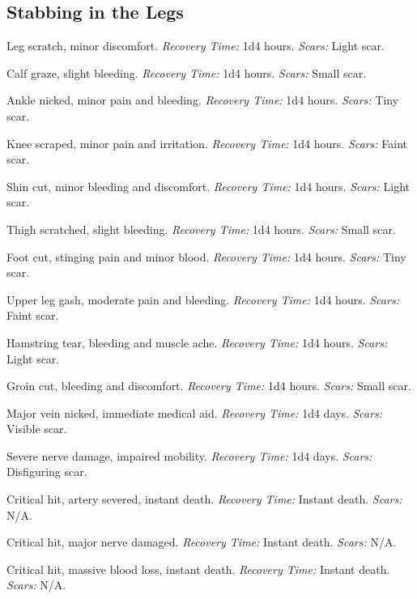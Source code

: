 \documentclass[12pt]{book}  %
\begin{document}
\subsection{Stabbing in the Legs}

\begin{description}[labelwidth=1.5em, leftmargin=*, itemsep=0.4em]
    \item[1 -] Leg scratch, minor discomfort. \textit{Recovery Time:} 1d4 hours. \textit{Scars:} Light scar.
    \item[2 -] Calf graze, slight bleeding. \textit{Recovery Time:} 1d4 hours. \textit{Scars:} Small scar.
    \item[3 -] Ankle nicked, minor pain and bleeding. \textit{Recovery Time:} 1d4 hours. \textit{Scars:} Tiny scar.
    \item[4 -] Knee scraped, minor pain and irritation. \textit{Recovery Time:} 1d4 hours. \textit{Scars:} Faint scar.
    \item[5 -] Shin cut, minor bleeding and discomfort. \textit{Recovery Time:} 1d4 hours. \textit{Scars:} Light scar.
    \item[6 -] Thigh scratched, slight bleeding. \textit{Recovery Time:} 1d4 hours. \textit{Scars:} Small scar.
    \item[7 -] Foot cut, stinging pain and minor blood. \textit{Recovery Time:} 1d4 hours. \textit{Scars:} Tiny scar.
    \item[8 -] Upper leg gash, moderate pain and bleeding. \textit{Recovery Time:} 1d4 hours. \textit{Scars:} Faint scar.
    \item[9 -] Hamstring tear, bleeding and muscle ache. \textit{Recovery Time:} 1d4 hours. \textit{Scars:} Light scar.
    \item[10 -] Groin cut, bleeding and discomfort. \textit{Recovery Time:} 1d4 hours. \textit{Scars:} Small scar.
    \item[11 -] Major vein nicked, immediate medical aid. \textit{Recovery Time:} 1d4 days. \textit{Scars:} Visible scar.
    \item[12 -] Severe nerve damage, impaired mobility. \textit{Recovery Time:} 1d4 days. \textit{Scars:} Disfiguring scar.
    \item[13 -] Critical hit, artery severed, instant death. \textit{Recovery Time:} Instant death. \textit{Scars:} N/A.
    \item[14 -] Critical hit, major nerve damaged. \textit{Recovery Time:} Instant death. \textit{Scars:} N/A.
    \item[15 -] Critical hit, massive blood loss, instant death. \textit{Recovery Time:} Instant death. \textit{Scars:} N/A.

\end{description}
\end{document}
